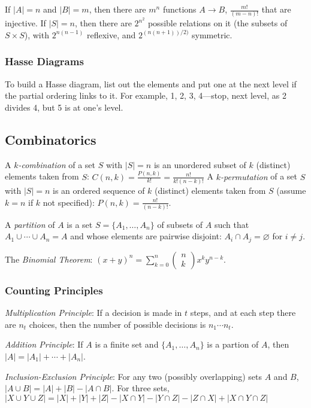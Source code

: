 \documentclass[10pt,letterpaper,twocolumn]{article}
\newcommand{\bico}[2]
    {\begin{pmatrix}#1 \\ #2\end{pmatrix}}
\begin{document}
If $ |A| = n $ and $ |B| = m $, then there 
are $ m^n $ functions $ A \to B $, 
$ \frac{m!}{(m-n)!} $ that are injective. If 
$ |S| = n $, then there are $ 2^{n^2} $ possible 
relations on it (the subsets of $ S \times S $), 
with $ 2^{n(n - 1)} $ reflexive, and 
$ 2^{(n(n + 1))/2)} $ symmetric.


\subsubsection{Hasse Diagrams}

To build a Hasse diagram, list out the elements
and put one at the next level if the partial ordering
links to it. For example, 1, 2, 3, 4---stop, 
next level, as 2 divides 4, but 5 is at one's level.


\subsection{Combinatorics} 


A \emph{$ k $-combination} 
of a set $ S $ with $ |S| = n $ 
is an unordered subset of $ k $ (distinct) elements
taken from $ S $: 
$ C(n, k) = \frac{P(n, k)}{k!} = \frac{n!}{k!(n-k)!} $
A \emph{$ k $-permutation} 
of a set $ S $ with $ |S| = n $
is an ordered sequence of $ k $ (distinct) elements
taken from $ S $ (assume $ k = n $ if $ k $ not 
specified): $ P(n, k) = \frac{n!}{(n - k)!} $.

A \emph{partition} of $ A $ is a set 
$ S = \{ A_1, \dots, A_n \} $ of subsets of $ A $ 
such that $ A_1 \cup \cdots \cup A_n = A $ and whose
elements are pairwise disjoint: 
$ A_i \cap A_j = \varnothing $ for $ i \neq j $.

The \emph{Binomial Theorem}:
$ (x + y)^n = \sum_{k=0}^n \bico{n}{k} x^k y^{n-k} $.

\subsubsection{Counting Principles}

\emph{Multiplication Principle}: If a decision 
is made in $ t $ steps, and at each step there
are $ n_t $ choices, then the number of possible 
decisions is $ n_1 \cdots n_t $. 

\emph{Addition Principle}: If $ A $ is a finite
set and $ \{ A_1, \dots, A_n \} $ is a partion of 
$ A $, then $ |A| = |A_1| + \cdots + |A_n| $.

\emph{Inclusion-Exclusion Principle}: For any two 
(possibly overlapping) sets $ A $ and $ B $, 
$ |A \cup B| = |A| + |B| - |A \cap B| $. For 
three sets, 
$ |X \cup Y \cup Z|
= |X| + |Y| + |Z| 
  - |X \cap Y| - |Y \cap Z| - |Z \cap X|
  + |X \cap Y \cap Z|
$
\end{document}
